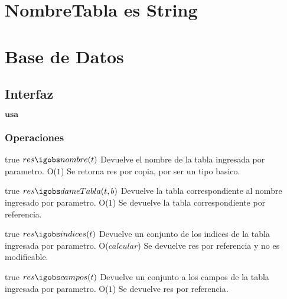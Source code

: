 


\section{NombreTabla es String}

\section{Base de Datos}

\subsection{Interfaz}

$\textbf{usa}$  


\subsubsection*{Operaciones}


%
 {true}
 {$res \igobs nombre(t)$}
 {Devuelve el nombre de la tabla ingresada por parametro.}
 {O($1$)}
 {Se retorna res por copia, por ser un tipo basico.}

 {true}
 {$res \igobs dameTabla(t,b)$}
 {Devuelve la tabla correspondiente al nombre ingresado por parametro.}
 {O($1$)}
 {Se devuelve la tabla correspondiente por referencia.}

 {true}
 {$res \igobs indices(t)$}
 {Devuelve un conjunto de los indices de la tabla ingresada por parametro.}
 {O($calcular$)}
 {Se devuelve res por referencia y no es modificable.}
 
 {true}
 {$res \igobs campos(t)$}
 {Devuelve un conjunto a los campos de la tabla ingresada por parametro.}
 {O($1$)}
 {Se devuelve res por referencia.}

